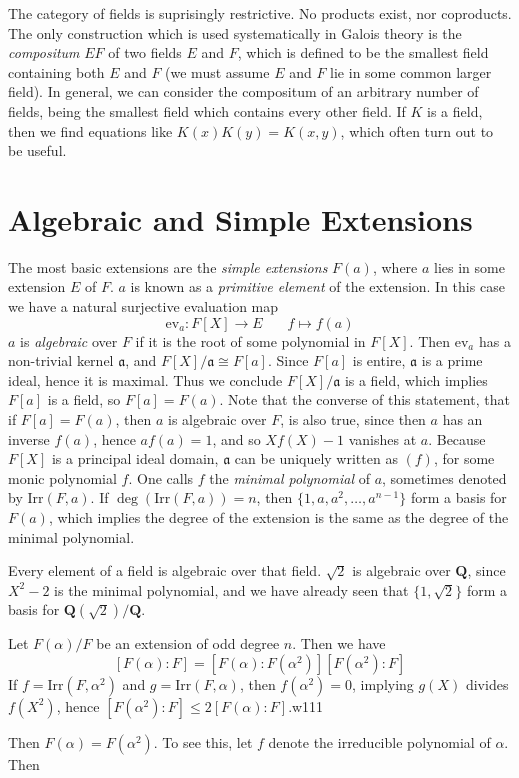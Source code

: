 The category of fields is suprisingly restrictive. No products exist, nor coproducts. The only construction which is used systematically in Galois theory is the {\it compositum} $EF$ of two fields $E$ and $F$, which is defined to be the smallest field containing both $E$ and $F$ (we must assume $E$ and $F$ lie in some common larger field). In general, we can consider the compositum of an arbitrary number of fields, being the smallest field which contains every other field. If $K$ is a field, then we find equations like $K(x)K(y) = K(x,y)$, which often turn out to be useful.

\section{Algebraic and Simple Extensions}

The most basic extensions are the {\it simple extensions} $F(a)$, where $a$ lies in some extension $E$ of $F$. $a$ is known as a {\it primitive element} of the extension. In this case we have a natural surjective evaluation map
%
\[ \text{ev}_a: F[X] \to E\ \ \ \ \ \ \ \ f \mapsto f(a) \]
%
$a$ is {\it algebraic} over $F$ if it is the root of some polynomial in $F[X]$. Then $\text{ev}_a$ has a non-trivial kernel $\mathfrak{a}$, and $F[X]/\mathfrak{a} \cong F[a]$. Since $F[a]$ is entire, $\mathfrak{a}$ is a prime ideal, hence it is maximal. Thus we conclude $F[X]/\mathfrak{a}$ is a field, which implies $F[a]$ is a field, so $F[a] = F(a)$. Note that the converse of this statement, that if $F[a] = F(a)$, then $a$ is algebraic over $F$, is also true, since then $a$ has an inverse $f(a)$, hence $af(a) = 1$, and so $Xf(X) - 1$ vanishes at $a$. Because $F[X]$ is a principal ideal domain, $\mathfrak{a}$ can be uniquely written as $(f)$, for some monic polynomial $f$. One calls $f$ the {\it minimal polynomial} of $a$, sometimes denoted by $\text{Irr}(F,a)$. If $\deg(\text{Irr}(F,a)) = n$, then $\{ 1, a, a^2, \dots, a^{n-1} \}$ form a basis for $F(a)$, which implies the degree of the extension is the same as the degree of the minimal polynomial.

\begin{example}
    Every element of a field is algebraic over that field. $\sqrt{2}$ is algebraic over $\mathbf{Q}$, since $X^2 - 2$ is the minimal polynomial, and we have already seen that $\{ 1, \sqrt{2} \}$ form a basis for $\mathbf{Q}(\sqrt{2})/\mathbf{Q}$.
\end{example}

\begin{example}
	Let $F(\alpha)/F$ be an extension of odd degree $n$. Then we have
	\[ [F(\alpha): F] = [F(\alpha): F(\alpha^2)] [F(\alpha^2): F] \]
	If $f = \text{Irr}(F,\alpha^2)$ and $g = \text{Irr}(F,\alpha)$, then $f(\alpha^2) = 0$, implying $g(X)$ divides $f(X^2)$, hence $[F(\alpha^2): F] \leq 2 [F(\alpha): F]$.w111


	Then $F(\alpha) = F(\alpha^2)$. To see this, let $f$ denote the irreducible polynomial of $\alpha$. Then
\end{example}

